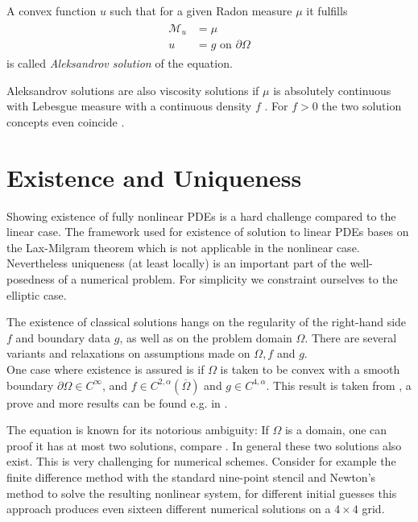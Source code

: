 \begin{definition}\label{def:aleksandrov solution}
A convex function $u$ such that for a given Radon measure $\mu$ it fulfills
\begin{align}
\begin{split}
\mathcal M_u&= \mu \\ 
u &= g  \text{ on } \partial \Omega
\end{split}
\end{align}
is called \emph{Aleksandrov solution} of the \MA equation.
\end{definition}

Aleksandrov solutions are also viscosity solutions if $\mu$ is absolutely continuous with Lebesgue measure with a continuous density $f$ \cite[proposition 1.3.4.]{Gutierrez2001} . For $f > 0$ the two solution concepts even coincide \cite[proposition 1.7.1]{Gutierrez2001}. 

\section{Existence and Uniqueness} \label{sec: Existence and Uniqueness}
Showing existence of fully nonlinear PDEs is a hard challenge compared to the linear case. The framework used for existence of solution to linear PDEs bases on the Lax-Milgram theorem which is not applicable in the nonlinear case. Nevertheless uniqueness (at least locally) is an important part of the well-posedness of a numerical problem. 
For simplicity we constraint ourselves to the elliptic case. 

The existence of classical solutions hangs on the regularity of the right-hand side $f$ and boundary data $g$, as well as on the problem domain $\Omega$. There are several variants and relaxations on assumptions made on $\Omega,f$ and $g$. \\
One case where existence is assured is if $\Omega$ is taken to be convex with a smooth boundary $\partial \Omega \in C^\infty$,  and $f \in C^{2,\alpha}(\overline \Omega)$ and $g \in C^{4,\alpha}$. This result is taken from \cite[p.357]{Neilan2014}, a prove and more results can be found e.g. in \cite{Gutierrez2001, GT1983, Urbas1998}.

The \MA equation is known for its notorious ambiguity: If $\Omega$ is a domain, one can proof it has at most two solutions, compare \cite[Kap.IV, \S 5,3]{CH1968}. In general these two solutions also exist.
This is very challenging for numerical schemes. Consider for example the finite difference method with the standard nine-point stencil and Newton's method to solve the resulting nonlinear system, for different initial guesses this approach produces even sixteen different numerical solutions on a $4 \times 4$ grid\cite{FGN2013}. 


